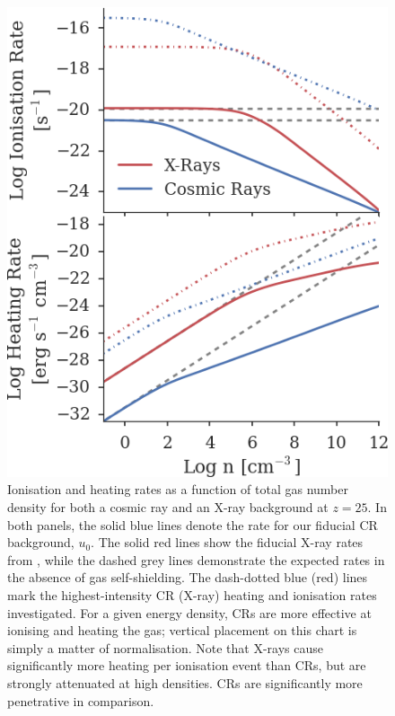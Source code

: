 \documentclass[usenatbib]{mn2e}
\begin{document}
\begin{figure}
\begin{center}
\includegraphics[width=\columnwidth]{figures/khrates/khrates}
\caption{\label{fig:khrates}
Ionisation and heating rates as a function of total gas number density for both a cosmic ray and an X-ray background at $z=25$. 
In both panels, the solid blue lines denote the rate for our fiducial CR background, $u_0$. The solid red lines show the fiducial X-ray rates from \citet{Hummeletal2015}, while the dashed grey lines demonstrate the expected rates in the absence of gas self-shielding.  
The dash-dotted blue (red) lines mark the highest-intensity CR (X-ray) heating and ionisation rates investigated. 
For a given energy density, CRs are more effective at ionising and heating the gas; vertical placement on this chart is simply a matter of normalisation. 
Note that X-rays cause significantly more heating per ionisation event than CRs, but are strongly attenuated at high densities. CRs are significantly more penetrative in comparison.%
}
\end{center}
\end{figure}
\end{document}
